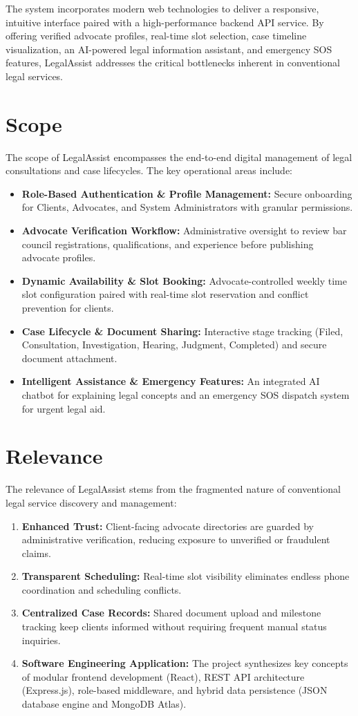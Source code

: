 \documentclass[12pt,a4paper]{report}
\begin{document}
The system incorporates modern web technologies to deliver a responsive, intuitive interface paired with a high-performance backend API service. By offering verified advocate profiles, real-time slot selection, case timeline visualization, an AI-powered legal information assistant, and emergency SOS features, LegalAssist addresses the critical bottlenecks inherent in conventional legal services.

\section{Scope}
The scope of LegalAssist encompasses the end-to-end digital management of legal consultations and case lifecycles. The key operational areas include:
\begin{itemize}
    \item \textbf{Role-Based Authentication \& Profile Management:} Secure onboarding for Clients, Advocates, and System Administrators with granular permissions.
    \item \textbf{Advocate Verification Workflow:} Administrative oversight to review bar council registrations, qualifications, and experience before publishing advocate profiles.
    \item \textbf{Dynamic Availability \& Slot Booking:} Advocate-controlled weekly time slot configuration paired with real-time slot reservation and conflict prevention for clients.
    \item \textbf{Case Lifecycle \& Document Sharing:} Interactive stage tracking (Filed, Consultation, Investigation, Hearing, Judgment, Completed) and secure document attachment.
    \item \textbf{Intelligent Assistance \& Emergency Features:} An integrated AI chatbot for explaining legal concepts and an emergency SOS dispatch system for urgent legal aid.
\end{itemize}

\section{Relevance}
The relevance of LegalAssist stems from the fragmented nature of conventional legal service discovery and management:
\begin{enumerate}
    \item \textbf{Enhanced Trust:} Client-facing advocate directories are guarded by administrative verification, reducing exposure to unverified or fraudulent claims.
    \item \textbf{Transparent Scheduling:} Real-time slot visibility eliminates endless phone coordination and scheduling conflicts.
    \item \textbf{Centralized Case Records:} Shared document upload and milestone tracking keep clients informed without requiring frequent manual status inquiries.
    \item \textbf{Software Engineering Application:} The project synthesizes key concepts of modular frontend development (React), REST API architecture (Express.js), role-based middleware, and hybrid data persistence (JSON database engine and MongoDB Atlas).
\end{enumerate}
\end{document}
